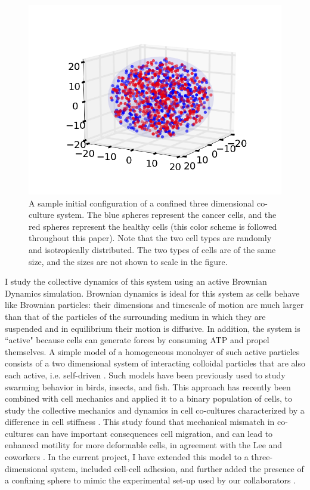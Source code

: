 \documentclass[aps,prb,twocolumn,groupedaddress,nofootinbib,floatfix]{revtex4}
\begin{document}
\begin{figure}
  \includegraphics[width=1.0\columnwidth]{images/3dconf.png}
  \caption[3dconf]
    {A sample initial configuration of a confined three dimensional co-culture system. The blue spheres represent the cancer cells, and the red spheres represent the healthy cells
    (this color scheme is followed throughout this paper). Note that the two cell types are randomly and isotropically distributed. The two types of cells are of the same size, and the sizes are not shown
    to scale in the figure.}
   \label{fig:3dconf}
\end{figure}

I study the collective dynamics of this system using an active Brownian Dynamics simulation. Brownian dynamics is ideal for this system as cells behave like Brownian particles: their dimensions and timescale of motion are much larger than that of the particles of the surrounding medium in which they are suspended and in equilibrium  their motion is diffusive.
In addition, the system is ``active" because cells can generate forces by consuming ATP and propel themselves.
A simple model of a homogeneous monolayer of such active particles consists of a two dimensional system of interacting colloidal particles that are also each active, i.e. self-driven \cite{FilyMarchetti,RednerBaskaran}. 
Such models have been previously used to study swarming  behavior \cite{Vicsek} in birds, insects, and fish.
This approach  has recently been combined with cell mechanics and applied it to a binary population of cells, to study the collective mechanics and dynamics in cell co-cultures characterized by a difference in cell stiffness \cite{Butcher}.
This study found that mechanical mismatch in co-cultures can have important consequences cell migration, and can lead to enhanced motility for more deformable cells\cite{Butcher}, 
in agreement with the Lee and coworkers \cite{Lee}. In the current project, I have extended this model to a three-dimensional system, included cell-cell adhesion, and further added the presence of a confining sphere to mimic the experimental set-up used by our collaborators \cite{Mingming}. 
\end{document}
